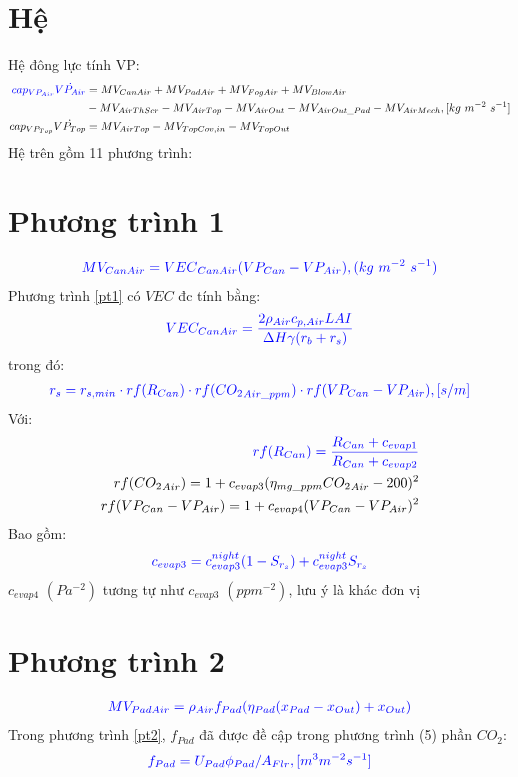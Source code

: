 \documentclass[13pt,a4paper]{article}
\begin{document}
	\tableofcontents
	\newpage
	\section{Hệ}
	Hệ đông lực tính VP:
	\begin{align*}
		\color{blue}
			cap_{VP_{Air}}\dot{VP_{Air}} &= MV_{CanAir} + MV_{PadAir} + MV_{FogAir} + MV_{BlowAir} \\
			& - MV_{AirThScr} - MV_{AirTop} - MV_{AirOut} - MV_{AirOut\_Pad} - MV_{AirMech}, [kg\ m^{-2}\ s^{-1}] \\
			cap_{VP_{Top}}\dot{VP_{Top}} &= MV_{AirTop} - MV_{TopCov,in} - MV_{TopOut}
		\color{blue}
	\end{align*}
	Hệ trên gồm 11 phương trình:
	\section{Phương trình 1}
		\begin{align}
			\color{blue}
				MV_{CanAir} = {VEC}_{CanAir}(VP_{Can} - VP_{Air}), (kg\ m^{-2}\ s^{-1})
			\color{blue}
			\label{pt1}
		\end{align}
		Phương trình \ref{pt1} có $VEC$ đc tính bằng:
		\begin{align*}
			\color{blue}
				VEC_{CanAir} = \dfrac{2\rho_{Air}c_{p,Air}LAI}{\Delta H \gamma (r_b + r_s)}
			\color{blue}
		\end{align*}
		trong đó:
		\begin{align*}
			\color{blue}
				r_s = r_{s,min}\cdot rf(R_{Can})\cdot rf({CO_2}_{Air\_ppm}) \cdot rf(VP_{Can} - VP_{Air}), [s/m]
			\color{blue}
		\end{align*}
		Với:
		\begin{align*}
			\color{blue}
				rf(R_{Can}) = \dfrac{R_{Can} + c_{evap1}}{R_{Can} + c_{evap2}} \\
				rf({CO_2}_{Air}) = 1 + c_{evap3}(\eta_{mg\_ppm} {CO_2}_{Air} - 200)^2 \\
				rf(VP_{Can} - VP_{Air}) = 1 + c_{evap4}(VP_{Can} - VP_{Air})^2
			\color{blue}
		\end{align*}
		Bao gồm:
		\begin{align*}
			\color{blue}
				c_{evap3} = c^{night}_{evap3}(1 - S_{r_s}) + c^{night}_{evap3} S_{r_s}
			\color{blue}
		\end{align*}
		$c_{evap4}$ $(Pa^{-2})$ tương tự như $c_{evap3}$ $(ppm^{-2})$, lưu ý là khác đơn vị
	\section{Phương trình 2}
		\begin{align}
			\color{blue}
				MV_{PadAir} = \rho_{Air}f_{Pad}(\eta_{Pad}(x_{Pad} - x_{Out}) + x_{Out})
			\color{blue}
			\label{pt2}
		\end{align}
		Trong phương trình \ref{pt2}, $f_{Pad}$ đã được đề cập trong phương trình (5) phần $CO_2$:
		\begin{align*}
			\color{blue}
				f_{Pad} = U_{Pad}\phi_{Pad} / A_{Flr}, [m^3 m^{-2} s^{-1}]
			\color{blue}
		\end{align*}
\end{document}
